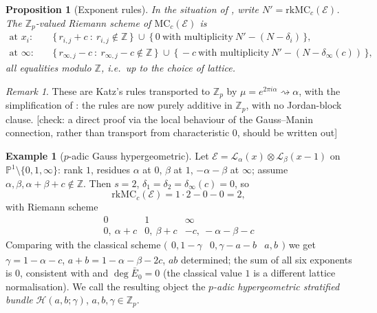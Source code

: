 \documentclass[11pt,reqno]{amsart}
\newcommand{\CHECK}[1]{{\color{blue!70!black}\textsf{[check: #1]}}}
\newcommand{\Zp}{\mathbb{Z}_p}
\newcommand{\ZZ}{\mathbb{Z}}
\newcommand{\PP}{\mathbb{P}}
\newcommand{\cE}{\mathcal{E}}
\newcommand{\cH}{\mathcal{H}}
\newcommand{\cL}{\mathcal{L}}
\newcommand{\rk}{\mathrm{rk}}
\newcommand{\MC}{\mathrm{MC}}
\theoremstyle{plain}
\newtheorem{proposition}[theorem]{Proposition}
\theoremstyle{definition}
\newtheorem{example}[theorem]{Example}
\theoremstyle{remark}
\newtheorem{remark}[theorem]{Remark}
\numberwithin{equation}{section}
\begin{document}
\begin{proposition}[Exponent rules]\label{prop:MCrules}
In the situation of , write $N'=\rk\MC_c(\cE)$.  The
$\Zp$-valued Riemann scheme of $\MC_c(\cE)$ is
\[
\begin{aligned}
   \text{at }x_i:&\quad \{\,r_{i,j}+c\ :\ r_{i,j}\notin\ZZ\,\}
     \ \cup\ \{\,0\ \text{with multiplicity}\ N'-(N-\delta_i)\,\},\\[2pt]
   \text{at }\infty:&\quad \{\,r_{\infty,j}-c\ :\ r_{\infty,j}-c\notin\ZZ\,\}
     \ \cup\ \{\,-c\ \text{with multiplicity}\ N'-(N-\delta_\infty(c))\,\},
\end{aligned}
\]
all equalities modulo $\ZZ$, i.e.\ up to the choice of lattice.
\end{proposition}

\begin{remark}
These are Katz's rules \cite[Ch.~6]{Katz2} transported to $\Zp$ by
$\mu=e^{2\pi i\alpha}\rightsquigarrow\alpha$, with the simplification of
: the rules are now purely additive in $\Zp$, with no
Jordan-block clause.
\CHECK{a direct proof via the local behaviour of the Gauss--Manin
connection, rather than transport from characteristic $0$, should be
written out}
\end{remark}

\begin{example}[$p$-adic Gauss hypergeometric]\label{ex:2F1}
Let $\cE=\cL_{\alpha}(x)\otimes\cL_{\beta}(x-1)$ on
$\PP^1\setminus\{0,1,\infty\}$: rank $1$, residues $\alpha$ at $0$,
$\beta$ at $1$, $-\alpha-\beta$ at $\infty$; assume
$\alpha,\beta,\alpha+\beta+c\notin\ZZ$.  Then $s=2$,
$\delta_1=\delta_2=\delta_\infty(c)=0$, so
\[
   \rk\MC_c(\cE)=1\cdot2-0-0=2,
\]
with Riemann scheme
\[
   \begin{array}{c|c|c}
   0 & 1 & \infty\\\hline
   0,\ \alpha+c & 0,\ \beta+c & -c,\ -\alpha-\beta-c
   \end{array}
\]
Comparing with the classical scheme
$\bigl(\begin{smallmatrix}0,1-\gamma&0,\gamma-a-b&a,b\end{smallmatrix}\bigr)$
we get $\gamma=1-\alpha-c$, $a+b=1-\alpha-\beta-2c$, $ab$ determined; the
sum of all six exponents is $0$, consistent with
 and $\deg\bar E_0=0$ (the classical value $1$ is a
different lattice normalisation).  We call the resulting object the
\emph{$p$-adic hypergeometric stratified bundle}
$\cH(a,b;\gamma)$, $a,b,\gamma\in\Zp$.
\end{example}
\end{document}
